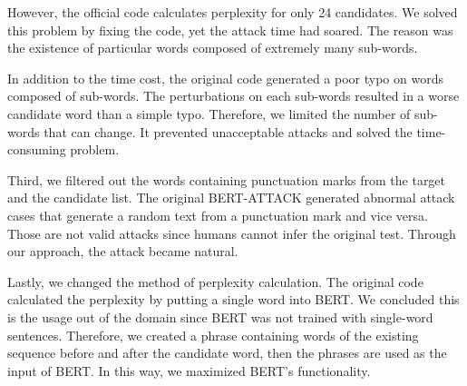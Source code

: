 \documentclass[11pt,a4paper]{article}
\begin{document}
\noindent However, the official code calculates perplexity for only 24 candidates. We solved this problem by fixing the code, yet the attack time had soared. The reason was the existence of particular words composed of extremely many sub-words.


In addition to the time cost, the original code generated a poor typo on words composed of sub-words. The perturbations on each sub-words resulted in a worse candidate word than a simple typo. Therefore, we limited the number of sub-words that can change. It prevented unacceptable attacks and solved the time-consuming problem.

Third, we filtered out the words containing punctuation marks from the target and the candidate list. The original BERT-ATTACK generated abnormal attack cases that generate a random text from a punctuation mark and vice versa. Those are not valid attacks since humans cannot infer the original test. Through our approach, the attack became natural. 

Lastly, we changed the method of perplexity calculation. The original code calculated the perplexity by putting a single word into BERT. We concluded this is the usage out of the domain since BERT was not trained with single-word sentences. Therefore, we created a phrase containing words of the existing sequence before and after the candidate word, then the phrases are used as the input of BERT. In this way, we maximized BERT’s functionality.

{\renewcommand{\arraystretch}{1.2}
\begin{table}[]
\caption{Types of modified models}
\label{tab:modification_setting}
\end{table}
}
\end{document}
